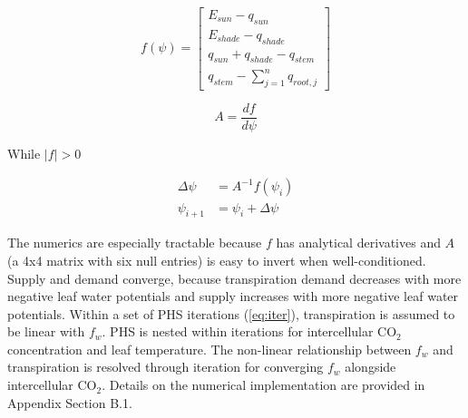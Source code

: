 \documentclass[draft,linenumbers]{agujournal}
\begin{document}
    \begin{linenomath*}
    \begin{equation}
    f\left(\psi\right) = \left[ 
    \begin{array}{c}
    E_{sun}-q_{sun}\\
    E_{shade}-q_{shade}\\
    q_{sun}+q_{shade}-q_{stem}\\
    q_{stem}-\sum_{j=1}^n{q_{root,j}}
    \end{array} \right]
    \end{equation}
    \end{linenomath*}
    
    \begin{linenomath*}
    \begin{equation}
    A = \dfrac{df}{d\psi}
    \end{equation}
    \end{linenomath*}    
    
    While $\left|f\right|>0$
    \begin{linenomath*}
    \begin{equation} \begin{aligned}
    \label{eq:iter}
    \Delta\psi &=A^{-1}f\left(\psi_i\right) \\
    \psi_{i+1}  &= \psi_i + \Delta\psi
    \end{aligned} \end{equation}
    \end{linenomath*}    
    
    The numerics are especially tractable because $f$ has analytical derivatives and $A$ 
    (a 4x4 matrix with six null entries) is easy to invert when well-conditioned. 
    Supply and demand converge, because transpiration demand decreases with more negative 
    leaf water potentials and supply increases with more negative leaf water potentials.
    Within a set of PHS iterations (\ref{eq:iter}), transpiration is assumed to be linear with $f_w$.
    PHS is nested within iterations for intercellular CO$_2$ concentration and leaf temperature.
    The non-linear relationship between $f_w$ and transpiration is resolved through iteration for converging $f_w$ alongside intercellular CO$_2$.
    Details on the numerical implementation are provided in Appendix Section B.1.

\end{document}
